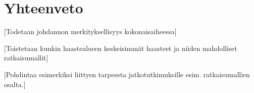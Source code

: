 \chapter{Yhteenveto\label{conclusions}}

[Todetaan johdannon merkityksellisyys kokonaisaiheessa]

[Toistetaan kunkin haastealueen keskeisimmät haasteet ja niiden mahdolliset ratkaisumallit]

[Pohdintaa esimerkiksi liittyen tarpeesta jatkotutkimuksille esim. ratkaisumallien osalta.]

